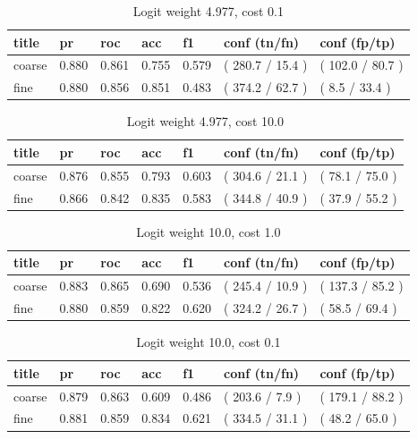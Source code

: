 \documentclass[ms]{nuthesis}
\begin{document}
\FloatBarrier
\begin{table}[H]
\centering
\caption{Logit weight 4.977, cost 0.1}
\label{tab:LogRegWtOrig-Cp1}
\begin{tabular}{|l||l||l||l||l||l||l|}\toprule
title & pr & roc & acc & f1 & conf (tn/fn) & conf (fp/tp) \\ \midrule
coarse & 0.880 & 0.861 & 0.755 & 0.579 & ( 280.7 / 15.4 ) & ( 102.0 / 80.7 ) \\
fine & 0.880 & 0.856 & 0.851 & 0.483 & ( 374.2 / 62.7 ) & ( 8.5 / 33.4 ) \\ \bottomrule
\end{tabular}
\end{table}
\FloatBarrier


\FloatBarrier
\begin{table}[H]
\centering
\caption{Logit weight 4.977, cost 10.0}
\label{tab:LogRegWtOrig-C10}
\begin{tabular}{|l||l||l||l||l||l||l|}\toprule
title & pr & roc & acc & f1 & conf (tn/fn) & conf (fp/tp) \\ \midrule
coarse & 0.876 & 0.855 & 0.793 & 0.603 & ( 304.6 / 21.1 ) & ( 78.1 / 75.0 ) \\
fine & 0.866 & 0.842 & 0.835 & 0.583 & ( 344.8 / 40.9 ) & ( 37.9 / 55.2 ) \\ \bottomrule
\end{tabular}
\end{table}
\FloatBarrier


\FloatBarrier
\begin{table}[H]
\centering
\caption{Logit weight 10.0, cost 1.0}
\label{tab:LogRegWt10-C1}
\begin{tabular}{|l||l||l||l||l||l||l|}\toprule
title & pr & roc & acc & f1 & conf (tn/fn) & conf (fp/tp) \\ \midrule
coarse & 0.883 & 0.865 & 0.690 & 0.536 & ( 245.4 / 10.9 ) & ( 137.3 / 85.2 ) \\
fine & 0.880 & 0.859 & 0.822 & 0.620 & ( 324.2 / 26.7 ) & ( 58.5 / 69.4 ) \\ \bottomrule
\end{tabular}
\end{table}
\FloatBarrier


\FloatBarrier
\begin{table}[H]
\centering
\caption{Logit weight 10.0, cost 0.1}
\label{tab:LogRegWt10-Cp1}
\begin{tabular}{|l||l||l||l||l||l||l|}\toprule
title & pr & roc & acc & f1 & conf (tn/fn) & conf (fp/tp) \\ \midrule
coarse & 0.879 & 0.863 & 0.609 & 0.486 & ( 203.6 / 7.9 ) & ( 179.1 / 88.2 ) \\
fine & 0.881 & 0.859 & 0.834 & 0.621 & ( 334.5 / 31.1 ) & ( 48.2 / 65.0 ) \\ \bottomrule
\end{tabular}
\end{table}
\FloatBarrier
\end{document}
